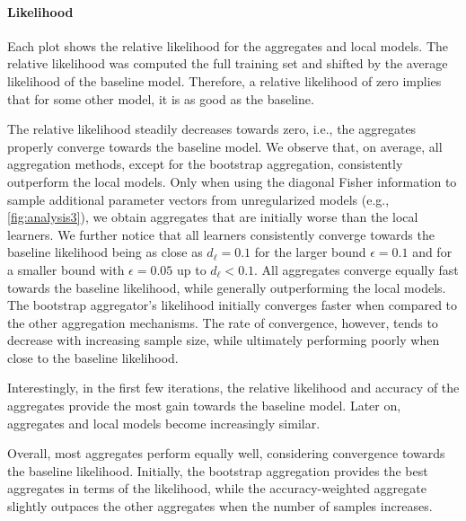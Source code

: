 \paragraph*{Likelihood}
Each plot shows the relative likelihood for the aggregates and local models.
The relative likelihood was computed \wrt the full training set and shifted by the average likelihood of the baseline model.
Therefore, a relative likelihood of zero implies that for some other model, it is as good as the baseline.

The relative likelihood steadily decreases towards zero, i.e., the aggregates properly converge towards the baseline model.
We observe that, on average, all aggregation methods, except for the bootstrap aggregation, consistently outperform the local models. 
Only when using the diagonal Fisher information to sample additional parameter vectors from unregularized models (e.g., \autoref{fig:analysis3}), we obtain aggregates that are initially worse than the local learners.
We further notice that all learners consistently converge towards the baseline likelihood being as close as $d_{\ell} = 0.1$ for the larger bound $\epsilon = 0.1$ and for a smaller bound with $\epsilon = 0.05$ up to $d_{\ell} < 0.1$.
All aggregates converge equally fast towards the baseline likelihood, while generally outperforming the local models.
The bootstrap aggregator's likelihood initially converges faster when compared to the other aggregation mechanisms. 
The rate of convergence, however, tends to decrease with increasing sample size, while ultimately performing poorly when close to the baseline likelihood.

Interestingly, in the first few iterations, the relative likelihood and accuracy of the aggregates provide the most gain towards the baseline model. 
Later on, aggregates and local models become increasingly similar. 

Overall, most aggregates perform equally well, considering convergence towards the baseline likelihood.
Initially, the bootstrap aggregation provides the best aggregates in terms of the likelihood, while the accuracy-weighted aggregate slightly outpaces the other aggregates when the number of samples increases.

